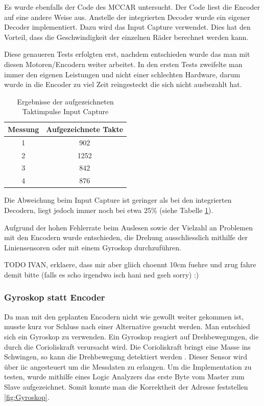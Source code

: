 Es wurde ebenfalls der Code des MCCAR untersucht. Der Code liest die Encoder auf eine andere Weise aus. Anstelle der integrierten Decoder wurde ein eigener Decoder implementiert. Dazu wird das Input Capture verwendet. Dies hat den Vorteil, dass die Geschwindigkeit der einzelnen Räder berechnet werden kann.


Diese genaueren Tests erfolgten erst, nachdem entschieden wurde das man mit diesen Motoren/Encodern weiter arbeitet. In den ersten Tests zweifelte man immer den eigenen Leistungen und nicht einer schlechten Hardware, darum wurde in die Encoder zu viel Zeit reingesteckt die sich nicht ausbezahlt hat.

\begin{table}[ht]
\centering
\caption{Ergebnisse der aufgezeichneten Taktimpulse Input Capture}
\label{tab:taktergebnisse_im}
\begin{tabular}{|c|c|}
\hline
\textbf{Messung} & \textbf{Aufgezeichnete Takte} \\
\hline
1 & 902 \\
2 & 1252 \\
3 & 842 \\
4 & 876 \\
\hline
\end{tabular}
\end{table}

Die Abweichung beim Input Capture ist geringer als bei den integrierten Decodern, liegt jedoch immer noch bei etwa 25\% (siehe Tabelle \ref{tab:taktergebnisse_im}).

Aufgrund der hohen Fehlerrate beim Auslesen sowie der Vielzahl an Problemen mit den Encodern wurde entschieden, die Drehung ausschliesslich mithilfe der Liniensensoren oder mit einem Gyroskop durchzuführen.

TODO IVAN, erklaere, dass mir aber gliich choennt 10cm fuehre und zrug fahre demit bitte (falls es scho irgendwo isch hani ned gseh sorry) :)

\subsubsection{Gyroskop statt Encoder}

Da man mit den geplanten Encodern nicht wie gewollt weiter gekommen ist, musste kurz vor Schluss nach einer Alternative gesucht werden. Man entschied sich ein Gyroskop zu verwenden. Ein Gyroskop reagiert auf Drehbewegungen, die durch die Corioliskraft verursacht wird. Die Corioliskraft bringt eine Masse ins Schwingen, so kann die Drehbewegung detektiert werden \parencite{zielke2025}. Dieser Sensor wird über \acrshort{iic} angesteuert um die Messdaten zu erlangen. Um die Implementation zu testen, wurde mithilfe eines Logic Analyzers das erste Byte vom Master zum Slave aufgezeichnet. Somit konnte man die Korrektheit der Adresse feststellen \ref{fig:Gyroskop}. 

